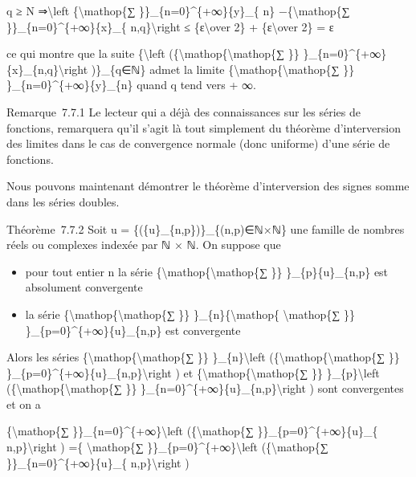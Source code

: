\documentclass[]{article}
\begin{document}
q ≥ N ⇒\textbackslash{}left \textbar{}\{\textbackslash{}mathop\{∑
\}\}\_\{n=0\}\^{}\{+∞\}\{y\}\_\{ n\} −\{\textbackslash{}mathop\{∑
\}\}\_\{n=0\}\^{}\{+∞\}\{x\}\_\{ n,q\}\textbackslash{}right \textbar{}≤
\{ε\textbackslash{}over 2\} + \{ε\textbackslash{}over 2\} = ε

ce qui montre que la suite \{\textbackslash{}left
(\{\textbackslash{}mathop\{\textbackslash{}mathop\{∑ \}\}
\}\_\{n=0\}\^{}\{+∞\}\{x\}\_\{n,q\}\textbackslash{}right )\}\_\{q∈ℕ\}
admet la limite \{\textbackslash{}mathop\{\textbackslash{}mathop\{∑ \}\}
\}\_\{n=0\}\^{}\{+∞\}\{y\}\_\{n\} quand q tend vers + ∞.

Remarque~7.7.1 Le lecteur qui a déjà des connaissances sur les séries de
fonctions, remarquera qu'il s'agit là tout simplement du théorème
d'interversion des limites dans le cas de convergence normale (donc
uniforme) d'une série de fonctions.

Nous pouvons maintenant démontrer le théorème d'interversion des signes
somme dans les séries doubles.

Théorème~7.7.2 Soit u = \{(\{u\}\_\{n,p\})\}\_\{(n,p)∈ℕ×ℕ\} une famille
de nombres réels ou complexes indexée par ℕ × ℕ. On suppose que

\begin{itemize}
\itemsep1pt\parskip0pt
\item
  pour tout entier n la série
  \{\textbackslash{}mathop\{\textbackslash{}mathop\{∑ \}\}
  \}\_\{p\}\{u\}\_\{n,p\} est absolument convergente
\item
  la série \{\textbackslash{}mathop\{\textbackslash{}mathop\{∑ \}\}
  \}\_\{n\}\{\textbackslash{}mathop\{ \textbackslash{}mathop\{∑ \}\}
  \}\_\{p=0\}\^{}\{+∞\}\textbar{}\{u\}\_\{n,p\}\textbar{} est
  convergente
\end{itemize}

Alors les séries \{\textbackslash{}mathop\{\textbackslash{}mathop\{∑
\}\} \}\_\{n\}\textbackslash{}left
(\{\textbackslash{}mathop\{\textbackslash{}mathop\{∑ \}\}
\}\_\{p=0\}\^{}\{+∞\}\{u\}\_\{n,p\}\textbackslash{}right ) et
\{\textbackslash{}mathop\{\textbackslash{}mathop\{∑ \}\}
\}\_\{p\}\textbackslash{}left
(\{\textbackslash{}mathop\{\textbackslash{}mathop\{∑ \}\}
\}\_\{n=0\}\^{}\{+∞\}\{u\}\_\{n,p\}\textbackslash{}right ) sont
convergentes et on a

\{\textbackslash{}mathop\{∑ \}\}\_\{n=0\}\^{}\{+∞\}\textbackslash{}left
(\{\textbackslash{}mathop\{∑ \}\}\_\{p=0\}\^{}\{+∞\}\{u\}\_\{
n,p\}\textbackslash{}right ) =\{ \textbackslash{}mathop\{∑
\}\}\_\{p=0\}\^{}\{+∞\}\textbackslash{}left (\{\textbackslash{}mathop\{∑
\}\}\_\{n=0\}\^{}\{+∞\}\{u\}\_\{ n,p\}\textbackslash{}right )
\end{document}
